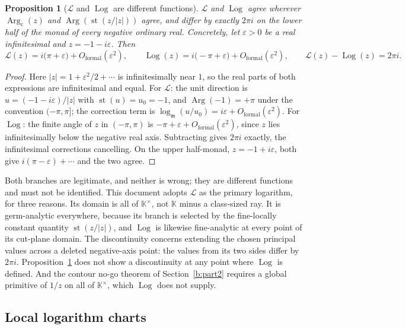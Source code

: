 \documentclass[11pt,a4paper]{article}
\numberwithin{equation}{section}
\newtheorem{proposition}[theorem]{Proposition}
\theoremstyle{definition}
\theoremstyle{remark}
\theoremstyle{plain}
\newcommand{\K}{\mathbb K}
\newcommand{\mm}{\mathfrak m}
\DeclareMathOperator{\st}{st}
\DeclareMathOperator{\Arg}{Arg}
\DeclareMathOperator{\Log}{Log}
\newcommand{\abs}[1]{\lvert #1\rvert}
\begin{document}
\begin{proposition}[$\mathcal L$ and $\Log$ are different functions]
\label{e:prop-logdiscrepancy}
$\mathcal L$ and $\Log$ agree wherever
$\Arg_{\mathrm c}(z)$ and $\Arg(\st(z/\abs z))$ agree, and differ by
exactly $2\pi i$ on the lower half of the monad of every negative ordinary real.
Concretely, let $\varepsilon>0$ be a real infinitesimal and
$z=-1-i\varepsilon$.  Then
\[
 \mathcal L(z)=i\bigl(\pi+\varepsilon\bigr)+O_{\mathrm{formal}}(\varepsilon^{2}),
 \qquad
 \Log(z)=i\bigl(-\pi+\varepsilon\bigr)+O_{\mathrm{formal}}(\varepsilon^{2}),
 \qquad
 \mathcal L(z)-\Log(z)=2\pi i .
\]
\end{proposition}

\begin{proof}
Here $\abs z=1+\varepsilon^{2}/2+\cdots$ is infinitesimally near $1$, so
the real parts of both expressions are infinitesimal and equal.  For
$\mathcal L$: the unit direction is
$u=(-1-i\varepsilon)/\abs z$ with $\st(u)=u_0=-1$, and
$\Arg(-1)=+\pi$ under the convention $(-\pi,\pi]$; the correction term is
$\log_{\mm}(u/u_0)=i\varepsilon+O_{\mathrm{formal}}(\varepsilon^{2})$.
For $\Log$: the finite angle of $z$ in $(-\pi,\pi)$ is
$-\pi+\varepsilon+O_{\mathrm{formal}}(\varepsilon^{2})$, since $z$ lies
infinitesimally below the negative real axis.  Subtracting gives
$2\pi i$ exactly, the infinitesimal corrections cancelling.  On the upper
half-monad, $z=-1+i\varepsilon$, both give
$i(\pi-\varepsilon)+\cdots$ and the two agree.
\end{proof}

Both branches are legitimate, and neither is wrong; they are different
functions and must not be identified.  This document adopts $\mathcal L$
as the primary logarithm, for three reasons.  Its domain is all of
$\K^{\times}$, not $\K$ minus a class-sized ray.  It is germ-analytic
everywhere, because its branch is selected by the fine-locally constant
quantity $\st(z/\abs z)$, and $\Log$ is likewise fine-analytic at every point of its cut-plane
domain. The discontinuity concerns extending the chosen principal
values across a deleted negative-axis point: the values from its two
sides differ by $2\pi i$. Proposition~\ref{e:prop-logdiscrepancy}
does not show a discontinuity at any point where $\Log$ is defined.  And the contour no-go theorem of
Section~\ref{b:part2} requires a global primitive of $1/z$ on all of $\K^{\times}$, which
$\Log$ does not supply.

\subsection{Local logarithm charts}\label{e:sec-logcharts}
\end{document}
